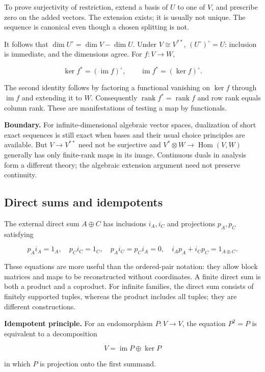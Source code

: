 \documentclass[
  11pt,
]{article}
\begin{document}
To prove surjectivity of restriction, extend a basis of \(U\) to one of
\(V\), and prescribe zero on the added vectors. The extension exists; it
is usually not unique. The sequence is canonical even though a chosen
splitting is not.

It follows that \(\dim U^\circ=\dim V-\dim U\). Under \(V\cong V^{**}\),
\((U^\circ)^\circ=U\): inclusion is immediate, and the dimensions agree.
For \(f:V\to W\),

\[\ker f^*=(\operatorname{im}f)^\circ,
\qquad \operatorname{im}f^*=(\ker f)^\circ.\]

The second identity follows by factoring a functional vanishing on
\(\ker f\) through \(\operatorname{im}f\) and extending it to \(W\).
Consequently \(\operatorname{rank}f^*=\operatorname{rank}f\) and row
rank equals column rank. These are manifestations of testing a map by
functionals.

\textbf{Boundary.} For infinite-dimensional algebraic vector spaces,
dualization of short exact sequences is still exact when bases and their
usual choice principles are available. But \(V\to V^{**}\) need not be
surjective and \(V^*\otimes W\to\operatorname{Hom}(V,W)\) generally has
only finite-rank maps in its image. Continuous duals in analysis form a
different theory; the algebraic extension argument need not preserve
continuity.

\subsection{Direct sums and
idempotents}\label{direct-sums-and-idempotents}

The external direct sum \(A\oplus C\) has inclusions \(i_A,i_C\) and
projections \(p_A,p_C\) satisfying

\[p_Ai_A=1_A,\quad p_Ci_C=1_C,\quad p_Ai_C=p_Ci_A=0,
\quad i_Ap_A+i_Cp_C=1_{A\oplus C}.\]

These equations are more useful than the ordered-pair notation: they
allow block matrices and maps to be reconstructed without coordinates. A
finite direct sum is both a product and a coproduct. For infinite
families, the direct sum consists of finitely supported tuples, whereas
the product includes all tuples; they are different constructions.

\textbf{Idempotent principle.} For an endomorphism \(P:V\to V\), the
equation \(P^2=P\) is equivalent to a decomposition

\[V=\operatorname{im}P\oplus\ker P\]

in which \(P\) is projection onto the first summand.
\end{document}
